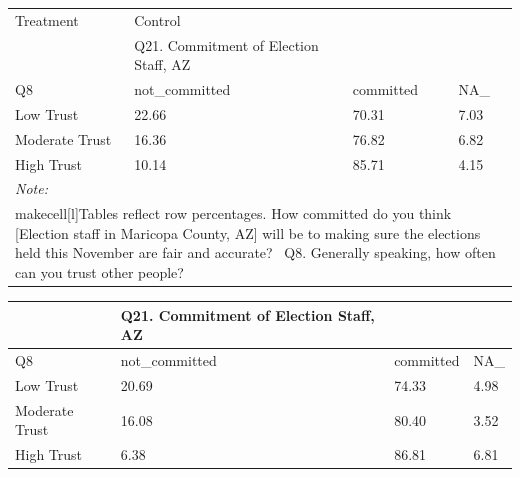 \documentclass[
  11pt,
  a4paper,
]{article}
\begin{document}
\begin{table}
\centering
\centering
\begin{tabular}[t]{l|l|l|l}
\hline
\multicolumn{1}{l|}{Treatment} & \multicolumn{1}{l}{Control} \\
\cline{1-1} \cline{2-2}
 & Q21. Commitment of Election Staff, AZ &  & \\
\hline
Q8 & not\_committed & committed & NA\_\\
\hline
Low Trust & 22.66 & 70.31 & 7.03\\
\hline
Moderate Trust & 16.36 & 76.82 & 6.82\\
\hline
High Trust & 10.14 & 85.71 & 4.15\\
\hline
\multicolumn{4}{l}{\rule{0pt}{1em}\textit{Note: }}\\
\multicolumn{4}{l}{\rule{0pt}{1em}makecell[l]{Tables reflect row percentages\Q21. How committed do you think [Election staff in Maricopa County, AZ] will be to making sure the elections held this November are fair and accurate? \ Q8. Generally speaking, how often can you trust other people?}}\\
\end{tabular}
\centering
\begin{tabular}[t]{l|l|l|l}
\hline
 & Q21. Commitment of Election Staff, AZ &  & \\
\hline
Q8 & not\_committed & committed & NA\_\\
\hline
Low Trust & 20.69 & 74.33 & 4.98\\
\hline
Moderate Trust & 16.08 & 80.40 & 3.52\\
\hline
High Trust & 6.38 & 86.81 & 6.81\\
\hline
\end{tabular}
\end{table}
\end{document}
